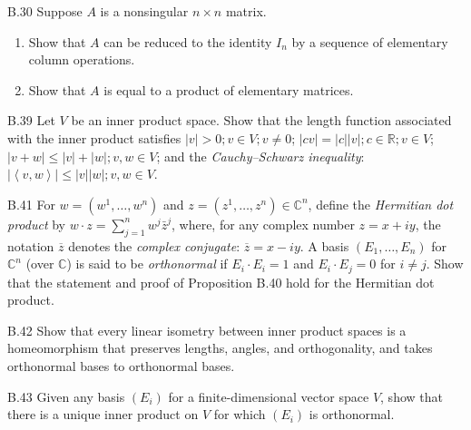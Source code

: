 \begin{exercise}{B.30}
    Suppose \( A \) is a nonsingular \( n \times n \) matrix.
    \begin{enumerate}[label={(\alph*)}]
        \item Show that \( A \) can be reduced to the identity \( I_{n} \) by a sequence of elementary column operations.
        \item Show that \( A \) is equal to a product of elementary matrices.
    \end{enumerate}
\end{exercise}

\begin{exercise}{B.39}
    Let \( V \) be an inner product space. Show that the length function associated with the inner product satisfies \( \left\vert v \right\vert > 0; v \in V; v \neq 0 \); \( \left\vert cv \right\vert = \left\vert c \right\vert \left\vert v \right\vert; c \in \mathbb{R}; v \in V \); \( \left\vert v + w \right\vert \le \left\vert v \right\vert + \left\vert w \right\vert; v, w \in V \); and the \emph{Cauchy–Schwarz inequality}: \( \left\vert \left\langle v, w \right\rangle \right\vert \le \left\vert v \right\vert \left\vert w \right\vert; v, w \in V \).
\end{exercise}

\begin{exercise}{B.41}
    For \( w = (w^{1}, \dots, w^{n}) \) and \( z = (z^{1}, \dots, z^{n}) \in \mathbb{C}^{n} \), define the \emph{Hermitian dot product} by \( w \cdot z = \sum_{j=1}^{n} w^{j} \bar{z}^{j} \), where, for any complex number \( z = x + iy \), the notation \( \overline{z} \) denotes the \emph{complex conjugate}: \( \overline{z} = x - iy \). A basis \( (E_{1}, \dots, E_{n}) \) for \( \mathbb{C}^{n} \) (over \( \mathbb{C} \)) is said to be \emph{orthonormal} if \( E_{i} \cdot E_{i} = 1 \) and \( E_{i} \cdot E_{j} = 0 \) for \( i \neq j \). Show that the statement and proof of Proposition B.40 hold for the Hermitian dot product.
\end{exercise}

\begin{exercise}{B.42}
    Show that every linear isometry between inner product spaces is a homeomorphism that preserves lengths, angles, and orthogonality, and takes orthonormal bases to orthonormal bases.
\end{exercise}

\begin{exercise}{B.43}
    Given any basis \( (E_{i}) \) for a finite-dimensional vector space \( V \), show that there is a unique inner product on \( V \) for which \( (E_{i}) \) is orthonormal.
\end{exercise}

